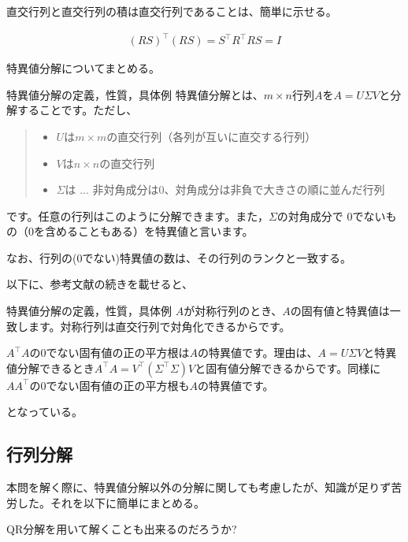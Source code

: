 \documentclass[a4paper, 10pt, dvipdfmx]{jlreq}
\begin{document}
直交行列と直交行列の積は直交行列であることは、簡単に示せる。

\begin{align*}
  (RS)^\top (RS)=S^\top R^\top RS=I
\end{align*}

特異値分解についてまとめる。

\begin{itembox}[l]{特異値分解の定義，性質，具体例\cite{site:3}}
  特異値分解とは、$m\times n$行列$A$を$A=U \Sigma V$と分解することです。ただし、

  \begin{quote}
    \begin{itemize}
      \item $U$は$m \times m$の直交行列（各列が互いに直交する行列）
      \item $V$は$n \times n$の直交行列
      \item $\Sigma$は ... 非対角成分は0、対角成分は非負で大きさの順に並んだ行列
    \end{itemize}
  \end{quote}

  です。任意の行列はこのように分解できます。また，$Σ$の対角成分で 0でないもの（0を含めることもある）を特異値と言います。
\end{itembox}

なお、行列の(0でない)特異値の数は、その行列のランクと一致する。

以下に、参考文献の続きを載せると、

\begin{itembox}[l]{特異値分解の定義，性質，具体例\cite{site:3}}
  $A$が対称行列のとき、$A$の固有値と特異値は一致します。対称行列は直交行列で対角化できるからです。

  $A^\top A$の0でない固有値の正の平方根は$A$の特異値です。理由は、$A=U\Sigma V$と特異値分解できるとき$A^\top A=V^\top (\Sigma^\top \Sigma)V$と固有値分解できるからです。同様に$AA^\top $の0でない固有値の正の平方根も$A$の特異値です。
\end{itembox}

となっている。

\subsection*{行列分解}

本問を解く際に、特異値分解以外の分解に関しても考慮したが、知識が足りず苦労した。それを以下に簡単にまとめる。

QR分解を用いて解くことも出来るのだろうか?
\end{document}
